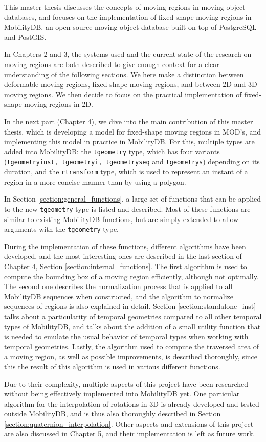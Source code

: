 \label{section:summary}

This master thesis discusses the concepts of moving regions in moving object databases, and focuses on the implementation of fixed-shape moving regions in MobilityDB, an open-source moving object database built on top of PostgreSQL and PostGIS.

In Chapters 2 and 3, the systems used and the current state of the research on moving regions are both described to give enough context for a clear understanding of the following sections. We here make a distinction between deformable moving regions, fixed-shape moving regions, and between 2D and 3D moving regions. We then decide to focus on the practical implementation of fixed-shape moving regions in 2D.

In the next part (Chapter 4), we dive into the main contribution of this master thesis, which is developing a model for fixed-shape moving regions in MOD's, and implementing this model in practice in MobilityDB. For this, multiple types are added into MobilityDB: the \lstinline{tgeometry} type, which has four variants (\lstinline{tgeometryinst, tgeometryi, tgeometryseq} and \lstinline{tgeometrys}) depending on its duration, and the \lstinline{rtransform} type, which is used to represent an instant of a region in a more concise manner than by using a polygon.

In Section \ref{section:general_functions}, a large set of functions that can be applied to the new \lstinline{tgeometry} type is listed and described. Most of these functions are similar to existing MobilityDB functions, but are simply extended to allow arguments with the \lstinline{tgeometry} type.

During the implementation of these functions, different algorithms have been developed, and the most interesting ones are described in the last section of Chapter 4, Section \ref{section:internal_functions}. The first algorithm is used to compute the bounding box of a moving region efficiently, although not optimally. The second one describes the normalization process that is applied to all MobilityDB sequences when constructed, and the algorithm to normalize sequences of regions is also explained in detail. Section \ref{section:standalone_inst} talks about a particularity of temporal geometries compared to all other temporal types of MobilityDB, and talks about the addition of a small utility function that is needed to emulate the usual behavior of temporal types when working with temporal geometries. Lastly, the algorithm used to compute the traversed area of a moving region, as well as possible improvements,  is described thoroughly, since this the result of this algorithm is used in various different functions.

Due to their complexity, multiple aspects of this project have been researched without being effectively implemented into MobilityDB yet. One particular algorithm for the interpolation of rotations in 3D is already developed and tested outside MobilityDB, and is thus also thoroughly described in Section \ref{section:quaternion_interpolation}. Other aspects and extensions of this project are also discussed in Chapter 5, and their implementation is left as future work.